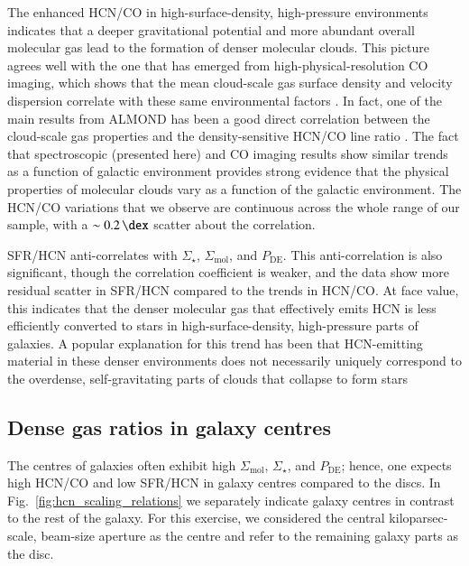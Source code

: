 \documentclass[letter, longauth]{aa} %
\newcommand*{\sigmol}{\ensuremath{\Sigma_{\text{mol}}}\xspace}  %
\newcommand*{\pde}{\ensuremath{P_{\text{DE}}}\xspace}  %
\newcommand*{\sigstar}{\ensuremath{\Sigma_{\star}}\xspace}  %
\begin{document}
The enhanced HCN/CO in high-surface-density, high-pressure environments indicates that a deeper gravitational potential and more abundant overall molecular gas lead to the formation of denser molecular clouds. 
This picture agrees well with the one that has emerged from high-physical-resolution CO imaging, which shows that the mean cloud-scale gas surface density and velocity dispersion correlate with these same environmental factors \citep[][]{Sun2022}. 
In fact, one of the main results from ALMOND has been a good direct correlation between the cloud-scale gas properties and the density-sensitive HCN/CO line ratio \citep{Neumann2023a}. 
The fact that spectroscopic (presented here) and CO imaging results show similar trends as a function of galactic environment provides strong evidence that the physical properties of molecular clouds vary as a function of the galactic environment. 
The HCN/CO variations that we observe are continuous across the whole range of our sample, with a $\sim\SI{0.2}{\dex}$ scatter about the correlation.

SFR/HCN anti-correlates with \sigstar, \sigmol, and \pde. 
This anti-correlation is also significant, though the correlation coefficient is weaker, and the data show more residual scatter in SFR/HCN compared to the trends in HCN/CO. 
At face value, this indicates that the denser molecular gas that effectively emits HCN is less efficiently converted to stars in high-surface-density, high-pressure parts of galaxies. 
A popular explanation for this trend has been that HCN-emitting material in these denser environments does not necessarily uniquely correspond to the overdense, self-gravitating parts of clouds that collapse to form stars \citep[e.g.][]{Krumholz2007, Shetty2014, Gallagher2018b, Neumann2023a, Bemis2023, Bemis2024}

\subsection{Dense gas ratios in galaxy centres}
\label{sec:centres}

The centres of galaxies often exhibit high \sigmol, \sigstar, and \pde; hence, one expects high HCN/CO and low SFR/HCN in galaxy centres compared to the discs. 
In Fig.~\ref{fig:hcn_scaling_relations} we separately indicate galaxy centres in contrast to the rest of the galaxy.
For this exercise, we considered the central kiloparsec-scale, beam-size aperture as the centre and refer to the remaining galaxy parts as the disc.
\end{document}
